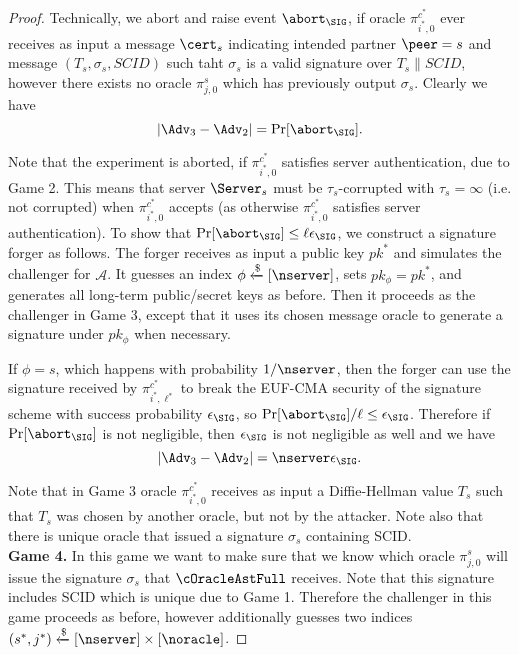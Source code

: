 \begin{proof}
 Technically, we abort and raise event $\abort_\SIG$, if oracle $\pi^{c^{\ast}}_{i^{\ast},0}$ ever receives as input a message $\cert_s$ indicating intended partner $\peer = s$ and message $(T_s,\sigma_s,SCID)$ such taht $\sigma_s$ is a valid signature over $T_s\|SCID$, however there exists no oracle $\pi^s_{j,0}$ which has previously output $\sigma_s$. Clearly we have
 \begin{equation}
  |\Adv_3 - \Adv_2| = \Pr[\abort_{\SIG}].
 \end{equation}%

 Note that the experiment is aborted, if $\pi^{c^{\ast}}_{i^{\ast},0}$ satisfies server authentication, due to Game 2. This means that server $\Server_s$ must be $\tau_s$-corrupted with $\tau_s = \infty$ (i.e. not corrupted) when $\pi^{c^{\ast}}_{i^{\ast},0}$ accepts (as otherwise $\pi^{c^{\ast}}_{i^{\ast},0}$ satisfies server authentication). To show that $\Pr[\abort_{\SIG}] \leq \ell \epsilon_{\SIG}$, we construct a signature forger as follows. The forger receives as input a public key $pk^{\ast}$ and simulates the challenger for $\mathcal{A}$. It guesses an index $\phi \xleftarrow{\$}[\nserver]$, sets $pk_{\phi} = pk^{\ast}$, and generates all long-term public/secret keys as before. Then it proceeds as the challenger in Game 3, except that it uses its chosen message oracle to generate a signature under $pk_{\phi}$ when necessary.

 If $\phi = s$, which happens with probability $1/\nserver$, then the forger can use the signature received by $\pi^{c^{\ast}}_{i^{\ast},\ell^{\ast}}$ to break the EUF-CMA security of the signature scheme with success probability $\epsilon_{\SIG}$, so $\Pr[\abort_{\SIG}]/\ell \leq \epsilon_{\SIG}$. Therefore if $\Pr[\abort_{\SIG}]$ is not negligible, then $\epsilon_{\SIG}$ is not negligible as well and we have
 \begin{equation}
  |\Adv_3 - \Adv_2| = \nserver \epsilon_{\SIG}.
 \end{equation}%

 Note that in Game 3 oracle $\pi^{c^{\ast}}_{i^{\ast},0}$ receives as input a Diffie-Hellman value $T_s$ such that $T_s$ was chosen by another oracle, but not by the attacker. Note also that there is unique oracle that issued a signature $\sigma_s$ containing SCID.
\vspace{10pt}\\%
%
%
 \textbf{Game 4.} In this game we want to make sure that we know which oracle $\pi^s_{j,0}$ will issue the signature $\sigma_s$ that $\cOracleAstFull$ receives. Note that this signature includes SCID which is unique due to Game 1. Therefore the challenger in this game proceeds as before, however additionally guesses two indices $(s^{\ast}, j^{\ast}) \xleftarrow{\$} [\nserver] \times [\noracle]$.


\end{proof}
